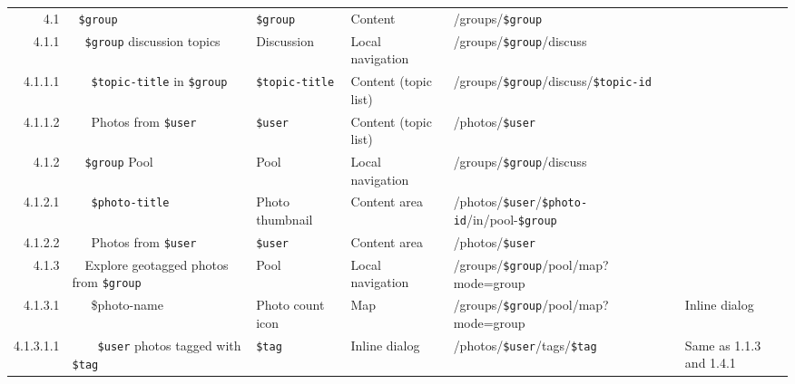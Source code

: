 \documentclass[12pt,a4paper]{article}
\newcommand{\var}[1]{\texttt{\${#1}}}
\begin{document}
\begin{landscape}
\begin{table}[h!b!p!]
\begin{center}
\begin{tiny}
\begin{tabular}{r|l|l|l|l|p{3cm}}
              4.1 &
              ~\var{group} &
              \var{group} &
              Content &
              /groups/\var{group} &
              \\

                4.1.1 &
                ~~\var{group} discussion topics &
                Discussion &
                Local navigation &
                /groups/\var{group}/discuss &
                \\

                  4.1.1.1 &
                  ~~~\var{topic-title} in \var{group} &
                  \var{topic-title} &
                  Content (topic list) &
                  /groups/\var{group}/discuss/\var{topic-id} &
                  \\

                  4.1.1.2 &
                  ~~~Photos from \var{user} &
                  \var{user} &
                  Content (topic list) &
                  /photos/\var{user} &
                  \\

                4.1.2 &
                ~~\var{group} Pool &
                Pool &
                Local navigation &
                /groups/\var{group}/discuss &
                \\

                  4.1.2.1 &
                  ~~~\var{photo-title} &
                  Photo thumbnail &
                  Content area &
                  /photos/\var{user}/\var{photo-id}/in/pool-\var{group} &
                  \\

                  4.1.2.2 &
                  ~~~Photos from \var{user} &
                  \var{user} &
                  Content area &
                  /photos/\var{user} &
                  \\

                4.1.3 &
                ~~Explore geotagged photos from \var{group}  &
                Pool &
                Local navigation &
                /groups/\var{group}/pool/map?mode=group &
                \\

                  4.1.3.1 &
                  ~~~\$photo-name &
                  Photo count icon &
                  Map &
                  /groups/\var{group}/pool/map?mode=group &
                  Inline dialog\\

                    4.1.3.1.1 &
                    ~~~~\var{user} photos tagged with \var{tag} &
                    \var{tag} &
                    Inline dialog &
                    /photos/\var{user}/tags/\var{tag} &
                    Same as 1.1.3 and 1.4.1\\


\end{tabular}
\end{tiny}
\end{center}
\end{table}
\end{landscape}
\end{document}
